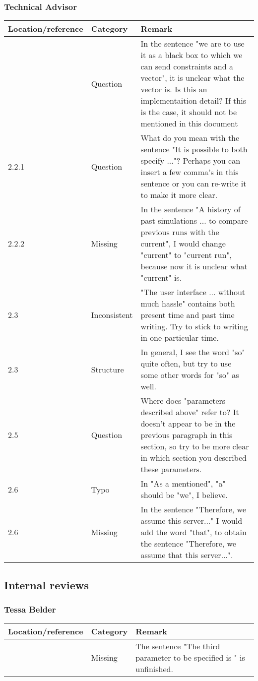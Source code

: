 \subsubsection*{Technical Advisor}
\begin{longtable}{l|l|p{}}
Location/reference & Category & Remark\\
\hline
\hline
\endhead
\hline
\endfoot
2.1 & Question & In the sentence "we are to use it as a black box to which we can send constraints and a vector", it is unclear what the vector is. Is this an implementaition detail? If this is the case, it should not be mentioned in this document \\
2.2.1 & Question & What do you mean with the sentence "It is possible to both specify ..."? Perhaps you can insert a few comma's in this sentence or you can re-write it to make it more clear. \\
2.2.2 & Missing & In the sentence "A history of past simulations ... to compare previous runs with the current", I would change "current" to "current run", because now it is unclear what "current" is.\\
2.3 & Inconsistent & "The user interface ... without much hassle" contains both present time and past time writing. Try to stick to writing in one particular time.\\
2.3 & Structure & In general, I see the word "so" quite often, but try to use some other words for "so" as well. \\
2.5 & Question & Where does "parameters described above" refer to? It doesn't appear to be in the previous paragraph in this section, so try to be more clear in which section you described these parameters. \\
2.6 & Typo & In "As a mentioned", "a" should be "we", I believe. \\
2.6 & Missing & In the sentence "Therefore, we assume this server..." I would add the word "that", to obtain the sentence "Therefore, we assume that this server...". \\
\end{longtable}

\newpage

\subsection{Internal reviews}
\subsubsection*{Tessa Belder}
\begin{longtable}{l|l|p{}}
Location/reference & Category & Remark\\
\hline
\hline
\endhead
\hline
\endfoot
2.2 & Missing & The sentence "The third parameter to be specified is " is unfinished.\\
\end{longtable}


